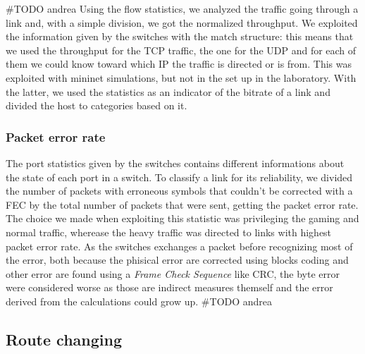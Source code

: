 \documentclass[conference,10pt]{IEEEtran}
\begin{document}
	  \#TODO andrea
		Using the flow statistics, we analyzed the traffic going through a link and, with a simple division, we got the normalized throughput.
		We exploited the information given by the switches with the match structure: this means that we used the throughput for the TCP traffic,
		the one for the UDP and for each of them we could know toward which IP the traffic is directed or is from. This was exploited with mininet
		simulations, but not in the set up in the laboratory. With the latter, we used the statistics as an indicator of the bitrate of a link
		and divided the host to categories based on it.

		\subsubsection{Packet error rate}

		The port statistics given by the switches contains different informations about the state of each port in a switch. To classify a link for its
		reliability, we divided the number of packets with erroneous symbols that couldn't be corrected with a FEC by the total number of packets that were sent,
		getting the packet error rate. The choice we made when exploiting this statistic was privileging the gaming and normal traffic, wherease the
		heavy traffic was directed to links with highest packet error rate.  As the switches exchanges a packet before recognizing most of the error, both because the
		phisical error are corrected using blocks coding and other error are found using a \textit{Frame Check Sequence} like CRC, the byte error were considered worse as
		those are indirect measures themself and the error derived from the calculations could grow up.
		\#TODO andrea

  \subsection{Route changing} %
\end{document}
